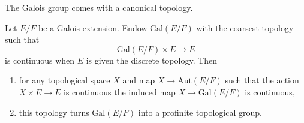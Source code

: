 \noindent
The Galois group comes with a canonical topology.

\begin{lemma}
\label{lemma-galois-profinite}
Let $E/F$ be a Galois extension. Endow $\text{Gal}(E/F)$ with the coarsest
topology such that
$$
\text{Gal}(E/F) \times E \longrightarrow E
$$
is continuous when $E$ is given the discrete topology. Then
\begin{enumerate}
\item for any topological space $X$ and map $X \to \text{Aut}(E/F)$
such that the action $X \times E \to E$ is continuous the induced map
$X \to \text{Gal}(E/F)$ is continuous,
\item this topology turns $\text{Gal}(E/F)$ into
a profinite topological group.
\end{enumerate}
\end{lemma}

